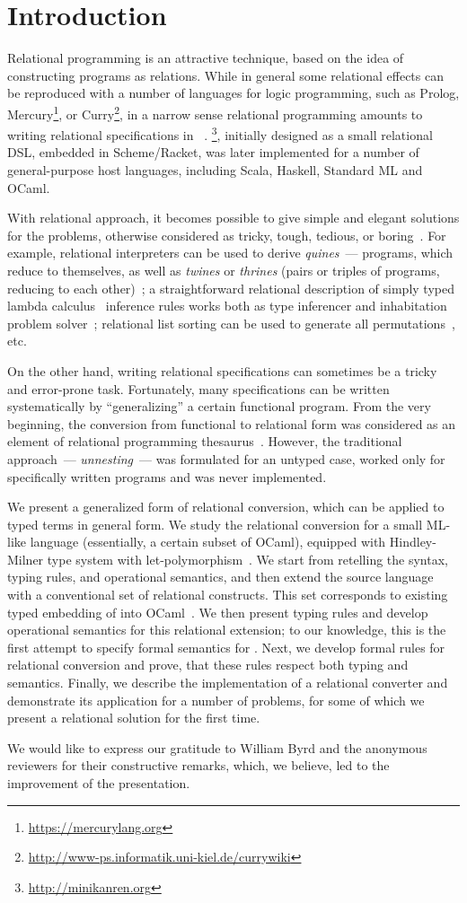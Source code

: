 \section{Introduction}
\label{intro}

Relational programming is an attractive technique, based on the idea of constructing programs as relations.
While in general some relational effects can be reproduced with a number of languages for logic programming, such as
Prolog, Mercury\footnote{\url{https://mercurylang.org}}, or Curry\footnote{\url{http://www-ps.informatik.uni-kiel.de/currywiki}}, in
a narrow sense relational programming amounts to writing relational specifications in \miniKanren~\cite{TRS}. \miniKanren\footnote{\url{http://minikanren.org}},
initially designed as a small relational DSL, embedded in Scheme/Racket, was later implemented for a number of general-purpose host languages,
including Scala, Haskell, Standard ML and OCaml.

With relational approach, it becomes possible to give simple and elegant solutions for the problems, otherwise
considered as tricky, tough, tedious, or boring~\cite{unified}. For example, relational interpreters can be used to derive
\emph{quines}~--- programs, which reduce to themselves, as well as \emph{twines} or \emph{thrines} (pairs or triples of
programs, reducing to each other)~\cite{Untagged}; a straightforward relational description of
simply typed lambda calculus~\cite{Lambda} inference rules works both as type inferencer and inhabitation problem solver~\cite{WillThesis};
relational list sorting can be used to generate all permutations~\cite{ocanren}, etc. 

On the other hand, writing relational specifications can sometimes be a tricky and error-prone task. Fortunately, many 
specifications can be written systematically by ``generalizing'' a certain functional program. From the very beginning, 
the conversion from functional to relational form was considered as an element of relational programming thesaurus~\cite{TRS}. However,
the traditional approach~--- \emph{unnesting}~--- was formulated for an untyped case, worked only for specifically written
programs and was never implemented.

We present a generalized form of relational conversion, which can be applied to typed terms in general form. We study the relational conversion 
for a small ML-like language (essentially, a certain subset of OCaml), equipped with Hindley-Milner type system with let-polymorphism~\cite{Types}. 
We start from retelling the syntax, typing rules, and operational semantics, and then extend the source language with a conventional set of 
relational constructs. This set corresponds to existing typed embedding of \miniKanren into OCaml~\cite{ocanren}. We then present typing rules and 
develop operational semantics for this relational extension; to our knowledge, this is the first attempt to specify formal semantics for
\miniKanren. Next, we develop formal rules for relational conversion and prove, that these rules respect both typing and
semantics. Finally, we describe the implementation of a relational converter and demonstrate its application for a number of problems, for some
of which we present a relational solution for the first time.

We would like to express our gratitude to William Byrd and the anonymous reviewers for their constructive remarks, which, we believe, led to the
improvement of the presentation. 

